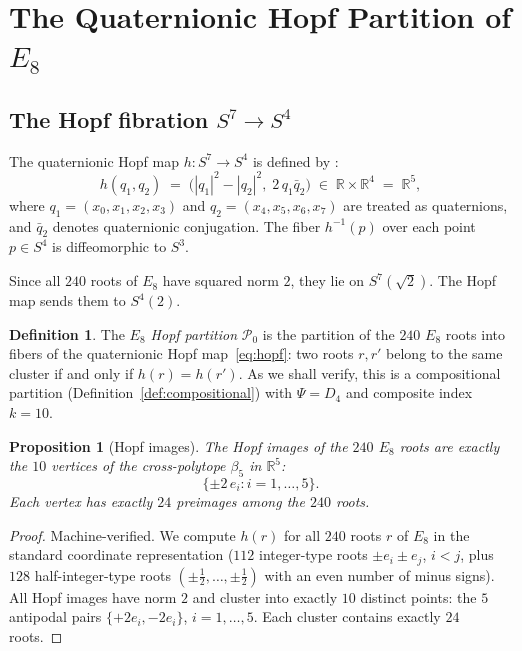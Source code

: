 \documentclass[11pt,reqno]{amsart}
\theoremstyle{plain}
\newtheorem{proposition}[theorem]{Proposition}
\theoremstyle{definition}
\newtheorem{definition}[theorem]{Definition}
\theoremstyle{remark}
\newcommand{\R}{\mathbb{R}}
\begin{document}
\section{The Quaternionic Hopf Partition of $E_8$}
\label{sec:hopf}

\subsection{The Hopf fibration $S^7 \to S^4$}

The quaternionic Hopf map
$h \colon S^7 \to S^4$ is defined by
\cite{Baez2002,Hopf1935}:
\begin{equation}\label{eq:hopf}
  h(q_1, q_2) \;=\;
  \bigl(|q_1|^2 - |q_2|^2,\; 2\,q_1 \bar{q}_2\bigr)
  \;\in\; \R \times \R^4 \;=\; \R^5,
\end{equation}
where $q_1 = (x_0,x_1,x_2,x_3)$ and $q_2 = (x_4,x_5,x_6,x_7)$
are treated as quaternions, and $\bar{q}_2$ denotes quaternionic
conjugation.
The fiber $h^{-1}(p)$ over each point $p \in S^4$ is
diffeomorphic to $S^3$.

Since all $240$ roots of $E_8$ have squared norm $2$,
they lie on $S^7(\sqrt{2})$.
The Hopf map sends them to $S^4(2)$.

\begin{definition}\label{def:hopfpartition}
The \emph{$E_8$ Hopf partition} $\mathcal{P}_0$ is the partition
of the $240$ $E_8$ roots into fibers of the quaternionic
Hopf map~\eqref{eq:hopf}:
two roots $r, r'$ belong to the same cluster if and only if
$h(r) = h(r')$.
As we shall verify, this is a compositional partition
(Definition~\ref{def:compositional}) with $\Psi = D_4$
and composite index $k = 10$.
\end{definition}

\begin{proposition}[Hopf images]\label{prop:crosspolytope}
The Hopf images of the $240$ $E_8$ roots are exactly the
$10$ vertices of the cross-polytope $\beta_5$ in $\R^5$:
\[
  \{\pm 2\, e_i : i = 1,\ldots,5\}.
\]
Each vertex has exactly $24$ preimages among the $240$ roots.
\end{proposition}

\begin{proof}
Machine-verified.
We compute $h(r)$ for all $240$ roots $r$ of $E_8$
in the standard coordinate representation
($112$ integer-type roots $\pm e_i \pm e_j$,
$i < j$, plus $128$ half-integer-type roots
$(\pm\tfrac{1}{2},\ldots,\pm\tfrac{1}{2})$ with an even
number of minus signs).
All Hopf images have norm $2$ and cluster into exactly $10$
distinct points: the $5$ antipodal pairs
$\{+2 e_i, -2 e_i\}$, $i=1,\ldots,5$.
Each cluster contains exactly $24$ roots.
\end{proof}
\end{document}
